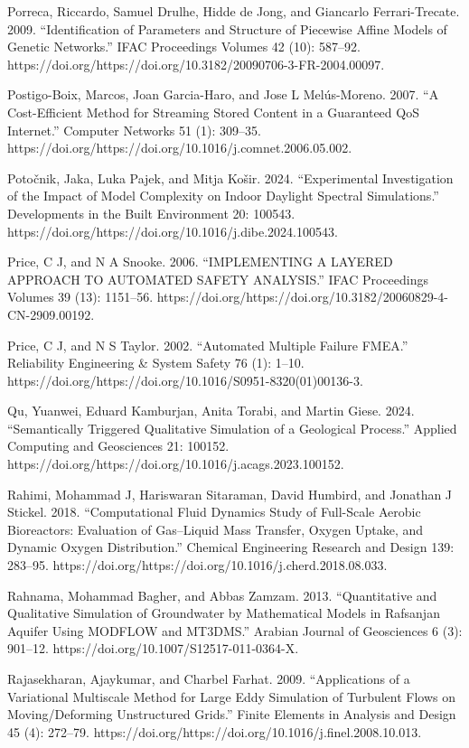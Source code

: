\documentclass[utf8]{gradu3}
\begin{document}
Porreca, Riccardo, Samuel Drulhe, Hidde de Jong, and Giancarlo Ferrari-Trecate. 2009. “Identification of Parameters and Structure of Piecewise Affine Models of Genetic Networks.” IFAC Proceedings Volumes 42 (10): 587–92. https://doi.org/https://doi.org/10.3182/20090706-3-FR-2004.00097.

Postigo-Boix, Marcos, Joan Garcia-Haro, and Jose L Melús-Moreno. 2007. “A Cost-Efficient Method for Streaming Stored Content in a Guaranteed QoS Internet.” Computer Networks 51 (1): 309–35. https://doi.org/https://doi.org/10.1016/j.comnet.2006.05.002.

Potočnik, Jaka, Luka Pajek, and Mitja Košir. 2024. “Experimental Investigation of the Impact of Model Complexity on Indoor Daylight Spectral Simulations.” Developments in the Built Environment 20: 100543. https://doi.org/https://doi.org/10.1016/j.dibe.2024.100543.

Price, C J, and N A Snooke. 2006. “IMPLEMENTING A LAYERED APPROACH TO AUTOMATED SAFETY ANALYSIS.” IFAC Proceedings Volumes 39 (13): 1151–56. https://doi.org/https://doi.org/10.3182/20060829-4-CN-2909.00192.

Price, C J, and N S Taylor. 2002. “Automated Multiple Failure FMEA.” Reliability Engineering \& System Safety 76 (1): 1–10. https://doi.org/https://doi.org/10.1016/S0951-8320(01)00136-3.

Qu, Yuanwei, Eduard Kamburjan, Anita Torabi, and Martin Giese. 2024. “Semantically Triggered Qualitative Simulation of a Geological Process.” Applied Computing and Geosciences 21: 100152. https://doi.org/https://doi.org/10.1016/j.acags.2023.100152.

Rahimi, Mohammad J, Hariswaran Sitaraman, David Humbird, and Jonathan J Stickel. 2018. “Computational Fluid Dynamics Study of Full-Scale Aerobic Bioreactors: Evaluation of Gas–Liquid Mass Transfer, Oxygen Uptake, and Dynamic Oxygen Distribution.” Chemical Engineering Research and Design 139: 283–95. https://doi.org/https://doi.org/10.1016/j.cherd.2018.08.033.

Rahnama, Mohammad Bagher, and Abbas Zamzam. 2013. “Quantitative and Qualitative Simulation of Groundwater by Mathematical Models in Rafsanjan Aquifer Using MODFLOW and MT3DMS.” Arabian Journal of Geosciences 6 (3): 901–12. https://doi.org/10.1007/S12517-011-0364-X.

Rajasekharan, Ajaykumar, and Charbel Farhat. 2009. “Applications of a Variational Multiscale Method for Large Eddy Simulation of Turbulent Flows on Moving/Deforming Unstructured Grids.” Finite Elements in Analysis and Design 45 (4): 272–79. https://doi.org/https://doi.org/10.1016/j.finel.2008.10.013.
\end{document}
